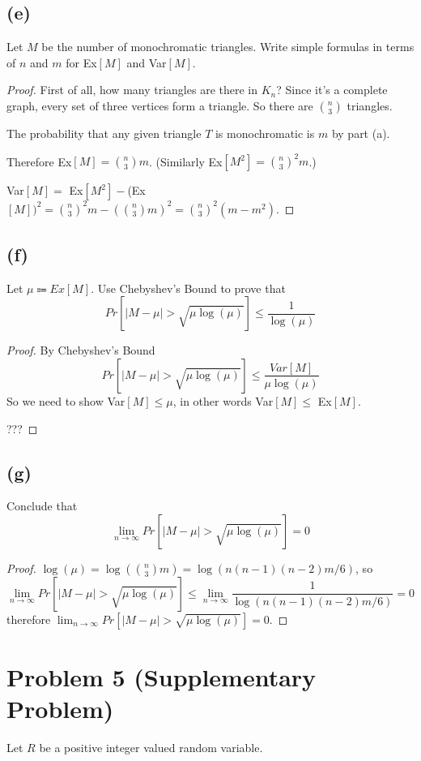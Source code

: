\documentclass[14pt]{extarticle}
\newcommand{\dps}{\displaystyle}
\begin{document}
\subsection{(e)}
Let $M$ be the number of monochromatic triangles. Write simple formulas in terms of $n$ and $m$ for Ex$[M]$ and Var$[M]$.

\begin{proof}
First of all, how many triangles are there in $K_n$? Since it's a complete graph, every set of three vertices form a triangle. So there are $\binom{n}{3}$ triangles.

The probability that any given triangle $T$ is monochromatic is $m$ by part (a).

Therefore Ex$[M] = \binom{n}{3}m$. (Similarly Ex$[M^2] = \binom{n}{3}^2 m$.)

Var$[M] = $ Ex$[M^2] - $(Ex$\dps [M])^2 = \binom{n}{3}^2 m - (\binom{n}{3} m)^2 = \binom{n}{3}^2(m - m^2)$.
\end{proof}

\subsection{(f)}
Let $\mu \Coloneqq Ex[M]$. Use Chebyshev’s Bound to prove that
$$
Pr[|M - \mu| > \sqrt{\mu \log(\mu)}] \leq \frac{1}{\log(\mu)}
$$

\begin{proof}
By Chebyshev's Bound
$$
Pr[|M - \mu| > \sqrt{\mu \log(\mu)}] \leq \frac{Var[M]}{\mu \log(\mu)}
$$
So we need to show Var$[M] \leq \mu$, in other words Var$[M] \leq$ Ex$[M]$.

???
\end{proof}

\subsection{(g)}
Conclude that
$$
\lim_{n \to \infty} Pr[|M - \mu| > \sqrt{\mu \log(\mu)}] = 0
$$
\begin{proof}
$\log(\mu) = \log(\binom{n}{3}m) = \log(n(n-1)(n-2)m / 6)$, so
$$
\lim_{n \to \infty} Pr[|M - \mu| > \sqrt{\mu \log(\mu)}] \leq \lim_{n \to \infty} \frac{1}{\log(n(n-1)(n-2)m / 6)} = 0
$$
therefore $\dps\lim_{n \to \infty} Pr[|M - \mu| > \sqrt{\mu \log(\mu)}] = 0$.
\end{proof}

\section{Problem 5 (Supplementary Problem)}
Let $R$ be a positive integer valued random variable.
\end{document}

